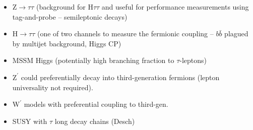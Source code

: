 \begin{itemize}
  \item $\mathrm{Z} \rightarrow \tau \tau$ (background for H$\tau \tau$ and
    useful for performance measurements using tag-and-probe -- semileptonic
    decays)

  \item $\mathrm{H} \rightarrow \tau \tau$ (one of two channels to measure
    the fermionic coupling -- $b \bar{b}$ plagued by multijet background,
    Higgs CP)

  \item MSSM Higgs (potentially high branching fraction to $\tau$-leptons)

  \item $\mathrm{Z}^\prime$ could preferentially decay into third-generation
    fermions (lepton universality not required).

  \item $\mathrm{W}^\prime$ models with preferential coupling to third-gen.

  \item SUSY with $\tau$ \textrightarrow long decay chains (Desch)
\end{itemize}

